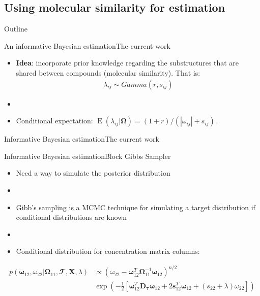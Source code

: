 \documentclass[xcolor=dvipsnames]{beamer}
\DeclareMathOperator{\EE}{E}
\begin{document}
\subsection{Using molecular similarity for estimation}
\begin{frame}{Outline}
	\vspace{-10.5pt}
	\tableofcontents[currentsection,subsectionstyle=show/shaded/hide]
\end{frame}
\begin{frame}{An informative Bayesian estimation}{The current work}
	\vspace{-15.5pt}
	\begin{itemize}
		\item \textbf{Idea}:  incorporate prior knowledge regarding the substructures that are shared between compounds (molecular similarity). That is:
		\begin{align*}
			\lambda_{ij}\sim Gamma(r,s_{ij})
		\end{align*}
		\item[]
		\item Conditional expectation: $\EE(\lambda_{ij}|\boldsymbol{\Omega})=(1+r)/(|\omega_{ij} |+s_{ij})$.
	\end{itemize}
\end{frame}

\begin{frame}{Informative Bayesian estimation}{The current work}
	\begin{center}
	\end{center}
\end{frame}

\begin{frame}{Informative Bayesian estimation}{Block Gibbs Sampler}
	\vspace{-10.5pt}
	\begin{itemize}
		\item Need a way to simulate the posterior distribution 
		\item[]
		\item Gibb's sampling is a MCMC technique for simulating a target distribution if conditional distributions are known
		\item[]
		\item Conditional distribution for concentration matrix columns:
	\end{itemize}
	\begin{align*}
	p(\boldsymbol{\omega}_{12}, \omega_{22}|\boldsymbol{\Omega}_{11},\mathbfcal{T},\textbf{X},\lambda) & \propto \left(\omega_{22}-\boldsymbol{\omega}_{12}^T \boldsymbol{\Omega}_{11}^{-1}\boldsymbol{\omega}_{12} \right)^{n/2} \\ &\exp \left( - \frac{1}{2}\left[ \boldsymbol{\omega}_{12}^T \textbf{D}_{\boldsymbol{\tau}} \boldsymbol{\omega}_{12}+ 2 
	\textbf{s}_{12}^T \boldsymbol{\omega}_{12} + (s_{22}+\lambda)\omega_{22}\right] \right)
	\end{align*}
\end{frame}
\end{document}
